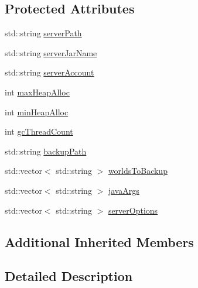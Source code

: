 \subsection*{Protected Attributes}
\begin{DoxyCompactItemize}
\item 
std\+::string \hyperlink{class_minecraft_server_service_1_1_bungee_cord_server_a6d51d89bb1978039381a04af2f7b5880}{server\+Path}
\item 
std\+::string \hyperlink{class_minecraft_server_service_1_1_bungee_cord_server_a68a7e4caf06617af4713dd905ec3ce52}{server\+Jar\+Name}
\item 
std\+::string \hyperlink{class_minecraft_server_service_1_1_bungee_cord_server_a962f4683af0dcd67eadb62875d926142}{server\+Account}
\item 
int \hyperlink{class_minecraft_server_service_1_1_bungee_cord_server_acefb624eabfc4d7516329e28ccb2acde}{max\+Heap\+Alloc}
\item 
int \hyperlink{class_minecraft_server_service_1_1_bungee_cord_server_a9a888b11ba14938f093957e4108bd22b}{min\+Heap\+Alloc}
\item 
int \hyperlink{class_minecraft_server_service_1_1_bungee_cord_server_a993736356331c55b759b8af235c547de}{gc\+Thread\+Count}
\item 
std\+::string \hyperlink{class_minecraft_server_service_1_1_bungee_cord_server_aa087aafe4137b677f19f1757e088ea08}{backup\+Path}
\item 
std\+::vector$<$ std\+::string $>$ \hyperlink{class_minecraft_server_service_1_1_bungee_cord_server_a9cdff082e45d4ef5ffc6c4fd7143e8b7}{worlds\+To\+Backup}
\item 
std\+::vector$<$ std\+::string $>$ \hyperlink{class_minecraft_server_service_1_1_bungee_cord_server_a23dbf0f91c62b61730c643f93f9e1927}{java\+Args}
\item 
std\+::vector$<$ std\+::string $>$ \hyperlink{class_minecraft_server_service_1_1_bungee_cord_server_a3fc820aa9d0a5620f10c59e585690aa5}{server\+Options}
\end{DoxyCompactItemize}
\subsection*{Additional Inherited Members}


\subsection{Detailed Description}


